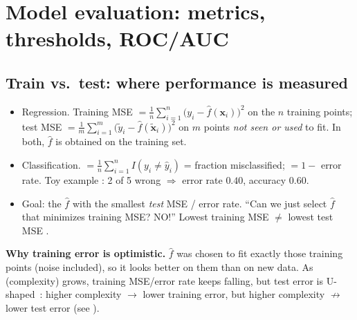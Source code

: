 \section{Model evaluation: metrics, thresholds, ROC/AUC}

\subsection{Train vs.\ test: where performance is measured}
\begin{keybox}
\begin{itemize}
\item Regression. Training MSE
  $=\frac1n\sum_{i=1}^{n}\big(y_i-\hat f(\mathbf x_i)\big)^2$ on the $n$ training points;
  test MSE $=\frac1m\sum_{i=1}^{m}\big(\tilde y_i-\hat f(\tilde{\mathbf x}_i)\big)^2$ on $m$
  points \emph{not seen or used} to fit. In both, $\hat f$ is obtained on the training set.
\item Classification.  $=\frac1n\sum_{i=1}^n I(y_i\ne\hat y_i)$ = fraction misclassified;
   $=1-$ error rate. Toy example : 2 of 5 wrong $\Rightarrow$ error rate $0.40$, accuracy $0.60$.
\item Goal: the $\hat f$ with the smallest \emph{test} MSE / error rate. ``Can we just select $\hat f$ that
  minimizes training MSE? NO!'' Lowest training MSE $\ne$ lowest test MSE .
\end{itemize}
\end{keybox}

\textbf{Why training error is optimistic.} $\hat f$ was chosen to fit exactly those training points
(noise included), so it looks better on them than on new data. As  (complexity) grows,
training MSE/error rate keeps falling, but test error is U-shaped \,:
higher complexity $\to$ lower training error, but higher complexity $\not\to$ lower test error
(see ).

